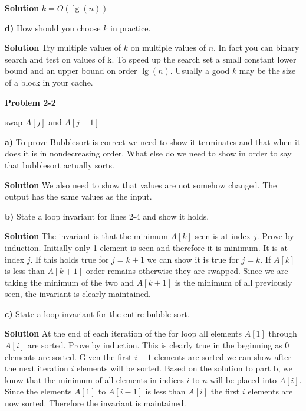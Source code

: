 \documentclass{article}
\begin{document}
\medskip

\textbf{Solution} $k = O(\lg(n))$

\medskip

\textbf{d)} How should you choose $k$ in practice.

\medskip

\textbf{Solution} Try multiple values of $k$ on multiple values of $n$. In fact you can binary search and test on values of k. To speed up the search set a small constant lower bound and an upper bound on order $\lg(n)$. Usually a good $k$ may be the size of a block in your cache.

\textbf{Problem 2-2}
\begin{algorithm}
\begin{algorithmic}[1]
			\State swap $A[j]$ and $A[j-1]$
		\EndIf
	\EndFor
\EndFor
\EndProcedure
\end{algorithmic}
\end{algorithm}

\textbf{a)} To prove Bubblesort is correct we need to show it terminates and that when it does it is in nondecreasing order. What else do we need to show in order to say that bubblesort actually sorts.

\medskip

\textbf{Solution} We also need to show that values are not somehow changed. The output has the same values as the input.

\medskip

\textbf{b)} State a loop invariant for lines 2-4 and show it holds.

\medskip

\textbf{Solution} The invariant is that the minimum $A[k]$ seen is at index $j$. Prove by induction. Initially only 1 element is seen and therefore it is minimum. It is at index $j$. If this holds true for $j = k+1$ we can show it is true for $j = k$. If $A[k]$ is less than $A[k+1]$ order remains otherwise they are swapped. Since we are taking the minimum of the two and $A[k+1]$ is the minimum of all previously seen, the invariant is clearly maintained.

\medskip

\textbf{c)} State a loop invariant for the entire bubble sort.

\medskip

\textbf{Solution} At the end of each iteration of the for loop all elements $A[1]$ through $A[i]$ are sorted. Prove by induction. This is clearly true in the beginning as 0 elements are sorted. Given the first $i-1$ elements are sorted we can show after the next iteration $i$ elements will be sorted. Based on the solution to part b, we know that the minimum of all elements in indices $i$ to $n$ will be placed into $A[i]$. Since the elements $A[1]$ to $A[i-1]$ is less than $A[i]$ the first $i$ elements are now sorted. Therefore the invariant is maintained.
\end{document}
